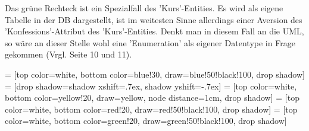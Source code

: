 \documentclass[12pt, twoside, a4paper, ngerman]{article}
\begin{document}
Das grüne Rechteck ist ein Spezialfall des 'Kurs'-Entities. Es wird als eigene Tabelle in der \ac{DB} dargestellt, ist im weitesten Sinne allerdings einer Aversion des 'Konfessions'-Attribut des 'Kurs'-Entities. Denkt man in diesem Fall an die \ac{UML}, so wäre an dieser Stelle wohl eine 'Enumeration' als eigener Datentype in Frage gekommen (Vrgl. \cite{BalzertH_UML2} Seite 10 und 11).

 = [top color=white, bottom color=blue!30, draw=blue!50!black!100, drop shadow]
 = [drop shadow={shadow xshift=.7ex, shadow yshift=-.7ex}]
 = [top color=white, bottom color=yellow!20, draw=yellow, node distance=1cm, drop shadow]
 = [top color=white, bottom color=red!20, draw=red!50!black!100, drop shadow]
 = [top color=white, bottom color=green!20, draw=green!50!black!100, drop shadow]
\end{document}
